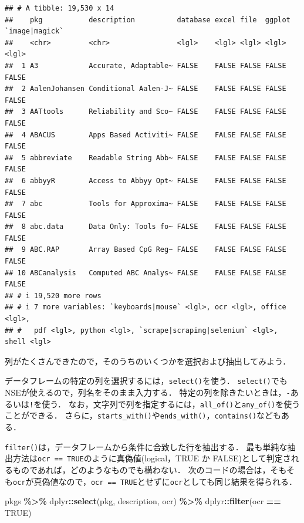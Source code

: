 \documentclass[
]{article}
\newenvironment{Shaded}{\begin{snugshade}}{\end{snugshade}}
\newcommand{\ConstantTok}[1]{\textcolor[rgb]{0.56,0.35,0.01}{#1}}
\newcommand{\FunctionTok}[1]{\textcolor[rgb]{0.13,0.29,0.53}{\textbf{#1}}}
\newcommand{\NormalTok}[1]{#1}
\newcommand{\SpecialCharTok}[1]{\textcolor[rgb]{0.81,0.36,0.00}{\textbf{#1}}}
\begin{document}
\begin{verbatim}
## # A tibble: 19,530 x 14
##    pkg           description          database excel file  ggplot `image|magick`
##    <chr>         <chr>                <lgl>    <lgl> <lgl> <lgl>  <lgl>         
##  1 A3            Accurate, Adaptable~ FALSE    FALSE FALSE FALSE  FALSE         
##  2 AalenJohansen Conditional Aalen-J~ FALSE    FALSE FALSE FALSE  FALSE         
##  3 AATtools      Reliability and Sco~ FALSE    FALSE FALSE FALSE  FALSE         
##  4 ABACUS        Apps Based Activiti~ FALSE    FALSE FALSE FALSE  FALSE         
##  5 abbreviate    Readable String Abb~ FALSE    FALSE FALSE FALSE  FALSE         
##  6 abbyyR        Access to Abbyy Opt~ FALSE    FALSE FALSE FALSE  FALSE         
##  7 abc           Tools for Approxima~ FALSE    FALSE FALSE FALSE  FALSE         
##  8 abc.data      Data Only: Tools fo~ FALSE    FALSE FALSE FALSE  FALSE         
##  9 ABC.RAP       Array Based CpG Reg~ FALSE    FALSE FALSE FALSE  FALSE         
## 10 ABCanalysis   Computed ABC Analys~ FALSE    FALSE FALSE FALSE  FALSE         
## # i 19,520 more rows
## # i 7 more variables: `keyboards|mouse` <lgl>, ocr <lgl>, office <lgl>,
## #   pdf <lgl>, python <lgl>, `scrape|scraping|selenium` <lgl>, shell <lgl>
\end{verbatim}

列がたくさんできたので，そのうちのいくつかを選択および抽出してみよう．

データフレームの特定の列を選択するには，\texttt{select()}を使う．
\texttt{select()}でもNSEが使えるので，列名をそのまま入力する．
特定の列を除きたいときは，\texttt{-}あるいは\texttt{!}を使う．
なお，文字列で列を指定するには，\texttt{all\_of()}と\texttt{any\_of()}を使うことができる．
さらに，\texttt{starts\_with()}や\texttt{ends\_with()}，\texttt{contains()}などもある．

\texttt{filter()}は，データフレームから条件に合致した行を抽出する．
最も単純な抽出方法は\texttt{ocr\ ==\ TRUE}のように真偽値(logical，TRUE か FALSE)として判定されるものであれば，どのようなものでも構わない．
次のコードの場合は，そもそも\texttt{ocr}が真偽値なので，\texttt{ocr\ ==\ TRUE}とせずに\texttt{ocr}としても同じ結果を得られる．

\begin{Shaded}
\begin{Highlighting}[]
\NormalTok{pkgs }\SpecialCharTok{\%\textgreater{}\%}
\NormalTok{  dplyr}\SpecialCharTok{::}\FunctionTok{select}\NormalTok{(pkg, description, ocr) }\SpecialCharTok{\%\textgreater{}\%}
\NormalTok{  dplyr}\SpecialCharTok{::}\FunctionTok{filter}\NormalTok{(ocr }\SpecialCharTok{==} \ConstantTok{TRUE}\NormalTok{)}
\end{Highlighting}
\end{Shaded}
\end{document}
